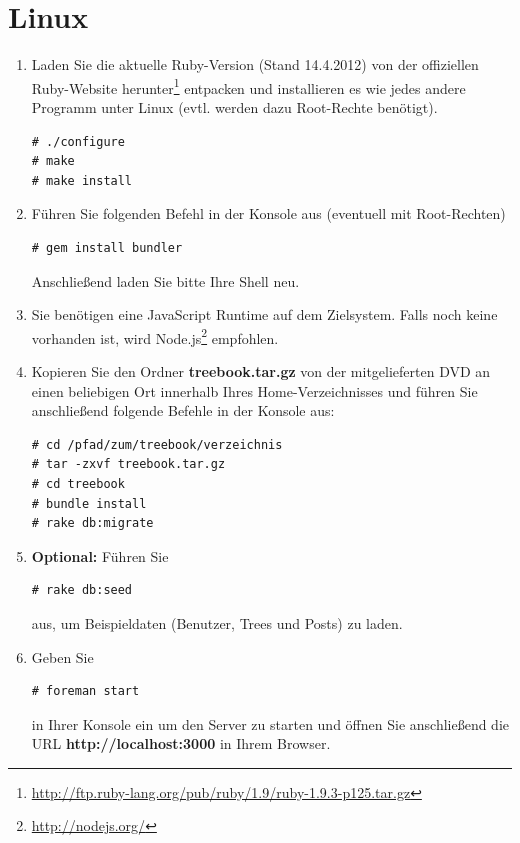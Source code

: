 \documentclass[10pt,a4paper]{book}
\begin{document}
\section{Linux}
\begin{enumerate}
\item Laden Sie die aktuelle Ruby-Version (Stand 14.4.2012) von der offiziellen Ruby-Website herunter\footnote{\href{http://ftp.ruby-lang.org/pub/ruby/1.9/ruby-1.9.3-p125.tar.gz}{http://ftp.ruby-lang.org/pub/ruby/1.9/ruby-1.9.3-p125.tar.gz}} entpacken und installieren es wie jedes andere Programm unter Linux (evtl. werden dazu Root-Rechte benötigt).
\lstset{language=bash}
\begin{lstlisting}
# ./configure
# make
# make install
\end{lstlisting}
\item Führen Sie folgenden Befehl in der Konsole aus (eventuell mit Root-Rechten)
\begin{lstlisting}
# gem install bundler
\end{lstlisting}
Anschließend laden Sie bitte Ihre Shell neu.
\item Sie benötigen eine JavaScript Runtime auf dem Zielsystem. Falls noch keine vorhanden ist, wird Node.js\footnote{\href{http://nodejs.org/}{http://nodejs.org/}} empfohlen.
\item Kopieren Sie den Ordner \textbf{treebook.tar.gz} von der mitgelieferten DVD an einen beliebigen Ort innerhalb Ihres Home-Verzeichnisses und führen Sie anschließend folgende Befehle in der Konsole aus:
\begin{lstlisting}
# cd /pfad/zum/treebook/verzeichnis
# tar -zxvf treebook.tar.gz
# cd treebook
# bundle install
# rake db:migrate
\end{lstlisting}
\item \textbf{Optional:} Führen Sie
\begin{lstlisting}
# rake db:seed
\end{lstlisting}
aus, um Beispieldaten (Benutzer, Trees und Posts) zu laden.
\item Geben Sie
\begin{lstlisting}
# foreman start
\end{lstlisting}
in Ihrer Konsole ein um den Server zu starten und öffnen Sie anschließend die URL \textbf{http://localhost:3000} in Ihrem Browser.
\end{enumerate}
\end{document}
